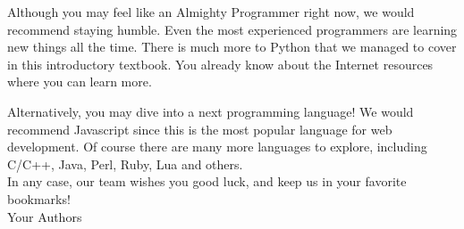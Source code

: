 \documentclass[article,A4,12pt]{llncs}
\begin{document}
Although you may feel like an Almighty Programmer right now, we would
recommend staying humble. Even the most experienced programmers are
learning new things all the time. There is much more to Python that 
we managed to cover in this introductory textbook. You already know 
about the Internet resources where you can learn more.  

Alternatively, you may dive into a next programming language! We would 
recommend Javascript since this is the most popular language for web 
development. Of course there are many more languages to explore, including 
C/C++, Java, Perl, Ruby, Lua and others.\\

\noindent
In any case, our team wishes you good luck, and keep us in your 
favorite bookmarks! \\

\hbox{} \hfill{} Your Authors
\end{document}
